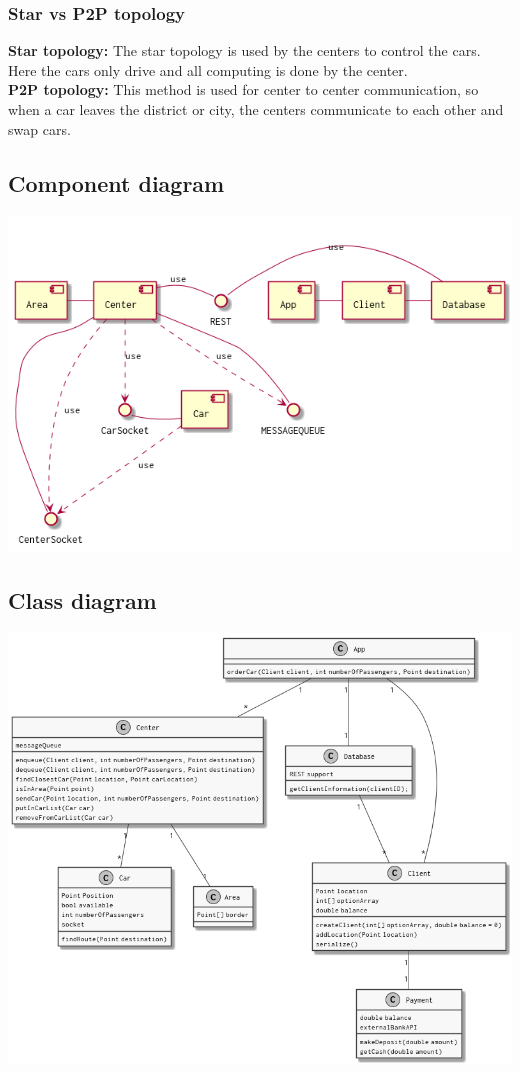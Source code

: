 \documentclass[a4paper]{article}
\begin{document}
\subsubsection*{Star vs P2P topology}
\textbf{Star topology:} The star topology is used by the centers to control the cars. Here the cars only drive and all computing is done by the center.\\
\textbf{P2P topology:} This method is used for center to center communication, so when a car leaves the district or city, the centers communicate to each other and swap cars.

\subsection*{Component diagram}
\includegraphics[width=1\textwidth]{../Diagrams/componentDiagram.png}

\subsection*{Class diagram}
\includegraphics[width=1\textwidth]{../Diagrams/classDiagram.png}
\end{document}
